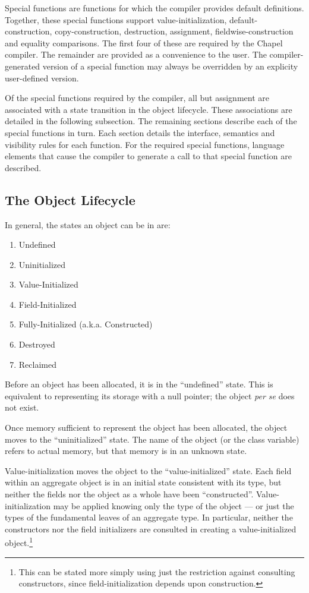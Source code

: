 
Special functions are functions for which the compiler provides default definitions.  
Together, these special functions support
value-initialization, default-construction,
copy-construction, destruction, assignment, fieldwise-construction and equality comparisons.
The first four of these are required by the Chapel
compiler.  The remainder are provided as a convenience
to the user.  The compiler-generated version of a special function may always be
overridden by an explicity user-defined version.

Of the special functions required by the compiler, all but assignment are associated with
a state transition in the object lifecycle.  These associations are detailed in the
following subsection.  The remaining sections describe each of the special functions in
turn.  Each section details the interface, semantics and visibility rules for each
function.  For the required special functions, language elements that cause
the compiler to generate a call to that special function are described.


\subsection{The Object Lifecycle}

In general, the states an object can be in are:
\begin{enumerate}
\item Undefined
\item Uninitialized
\item Value-Initialized
\item Field-Initialized
\item Fully-Initialized (a.k.a. Constructed)
\item Destroyed
\item Reclaimed
\end{enumerate}

Before an object has been allocated, it is in the ``undefined'' state.  This is
equivalent to representing its storage with a null pointer; the object {\it per
se} does not exist.

Once memory sufficient to represent the object has been allocated, the object
moves to the ``uninitialized'' state.  The name of the object (or the class
variable) refers to actual memory, but that memory is in an unknown state.

Value-initialization moves the object to the ``value-initialized'' state.  Each
field within an aggregate object is in an initial state consistent with its type,
but neither the fields nor the object as a whole have been ``constructed''.
Value-initialization may be applied knowing only the type of the object --- or
just the types of the fundamental leaves of an aggregate type.  In particular,
neither the constructors nor the field initializers are consulted in creating a
value-initialized object.\footnote{This can be stated more simply using just the
  restriction against consulting constructors, since field-initialization
  depends upon construction.}

